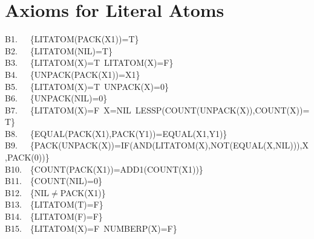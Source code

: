 \documentclass[11pt]{book}
\newenvironment{pubasis}{\begin{flushleft}\ttfamily\small}{\normalsize\rmfamily\end{flushleft}}
\newcommand{\pubdefaulttextsize}{\large}
\begin{document}
\section{Axioms for Literal Atoms}
\pubdefaulttextsize
\begin{pubasis}
B1.~~~\{LITATOM(PACK(X1))=T\}\\

B2.~~~\{LITATOM(NIL)=T\}\\

B3.~~~\{LITATOM(X)=T~LITATOM(X)=F\}\\

B4.~~~\{UNPACK(PACK(X1))=X1\}\\

B5.~~~\{LITATOM(X)=T~UNPACK(X)=0\}\\

B6.~~~\{UNPACK(NIL)=0\}\\

B7.~~~\{LITATOM(X)=F~X=NIL~LESSP(COUNT(UNPACK(X)),COUNT(X))=T\}\\

B8.~~~\{EQUAL(PACK(X1),PACK(Y1))=EQUAL(X1,Y1)\}\\

B9.~~~\{PACK(UNPACK(X))=IF(AND(LITATOM(X),NOT(EQUAL(X,NIL))),X,PACK(0))\}\\

B10.~~\{COUNT(PACK(X1))=ADD1(COUNT(X1))\}\\

B11.~~\{COUNT(NIL)=0\}\\

B12.~~\{NIL$\neq$PACK(X1)\}\\

B13.~~\{LITATOM(T)=F\}\\

B14.~~\{LITATOM(F)=F\}\\

B15.~~\{LITATOM(X)=F~NUMBERP(X)=F\}\\
\end{pubasis}
\end{document}

